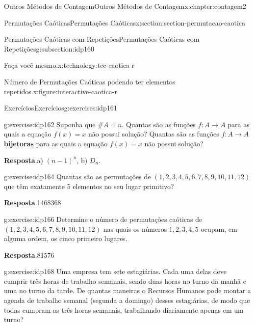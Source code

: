 \documentclass[oneside,10pt,]{book}
\newcommand{\blocktitlefont}{\relax}
\newcommand{\terminology}[1]{\textbf{#1}}
\numberwithin{equation}{section}
\begin{document}
\begin{chapterptx}{Outros Métodos de Contagem}{}{Outros Métodos de Contagem}{}{}{x:chapter:contagem2}
\begin{sectionptx}{Permutações Caóticas}{}{Permutações Caóticas}{}{}{x:section:section-permutacao-caotica}
\begin{subsectionptx}{Permutações Caóticas com Repetições}{}{Permutações Caóticas com Repetições}{}{}{g:subsection:idp160}
\begin{technology}{Faça você mesmo.}{x:technology:tec-caotica-r}
\begin{figureptx}{Número de Permutações Caóticas podendo ter elementos repetidos.}{x:figure:interactive-caotica-r}{}
\begin{tcbraster}[raster columns=2, raster column skip=1pt, raster halign=center, raster force size=false, raster left skip=0pt, raster right skip=0pt]
\begin{tcolorbox}[qrstyle]
\end{tcolorbox}%
\end{tcbraster}%
\tcblower
\end{figureptx}%
\end{technology}
\end{subsectionptx}
%
%
\typeout{************************************************}
\typeout{************************************************}
%
\begin{exercises-subsection}{Exercícios}{}{Exercícios}{}{}{g:exercises:idp161}
\begin{divisionexercise}{1}{}{}{g:exercise:idp162}%
Suponha que \(\#A=n\). Quantas são as funções \(f:A\rightarrow A\) para as quais a equação \(f(x)=x\) não possui solução? Quantas são as funções \(f:A\rightarrow A\) \terminology{bijetoras} para as quais a equação \(f(x)=x\) não possui solução?%
\par\smallskip%
\noindent\textbf{\blocktitlefont Resposta}.\hypertarget{g:answer:idp163}{}\quad{}a) \((n-1)^n\), b) \(D_n\).%
\end{divisionexercise}%
\begin{divisionexercise}{2}{}{}{g:exercise:idp164}%
Quantas são as permutações de \((1, 2, 3, 4, 5, 6, 7, 8, 9, 10, 11, 12)\) que têm exatamente 5 elementos no seu lugar primitivo?%
\par\smallskip%
\noindent\textbf{\blocktitlefont Resposta}.\hypertarget{g:answer:idp165}{}\quad{}1468368%
\end{divisionexercise}%
\begin{divisionexercise}{3}{}{}{g:exercise:idp166}%
Determine o número de permutações caóticas de \((1, 2, 3, 4, 5, 6, 7, 8, 9, 10, 11, 12)\) nas quais os números \(1, 2, 3, 4, 5\) ocupam, em alguma ordem, os cinco primeiro lugares.%
\par\smallskip%
\noindent\textbf{\blocktitlefont Resposta}.\hypertarget{g:answer:idp167}{}\quad{}81576%
\end{divisionexercise}%
\begin{divisionexercise}{4}{}{}{g:exercise:idp168}%
Uma empresa tem sete estagiárias. Cada uma delas deve cumprir três horas de trabalho semanais, sendo duas horas no turno da manhã e uma no turno da tarde. De quantas maneiras o Recursos Humanos pode montar a agenda de trabalho semanal (segunda a domingo) desses estagiárias, de modo que todas cumpram as três horas semanais, trabalhando diariamente apenas em um turno?%
\par\smallskip%

\end{divisionexercise}
\end{exercises-subsection}
\end{sectionptx}
\end{chapterptx}
\end{document}
